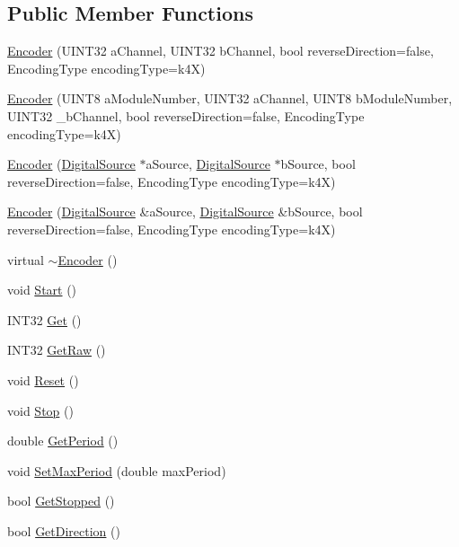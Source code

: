\subsection*{Public Member Functions}
\begin{DoxyCompactItemize}
\item 
\hyperlink{classEncoder_ae47a6cd11da6de3a2b03f4456b98c39b}{Encoder} (UINT32 aChannel, UINT32 bChannel, bool reverseDirection=false, EncodingType encodingType=k4X)
\item 
\hyperlink{classEncoder_a50acabf43b8473be8489ff29748e26e6}{Encoder} (UINT8 aModuleNumber, UINT32 aChannel, UINT8 bModuleNumber, UINT32 \_\-bChannel, bool reverseDirection=false, EncodingType encodingType=k4X)
\item 
\hyperlink{classEncoder_aa5f1987f6278c0b45c801b129f8222c9}{Encoder} (\hyperlink{classDigitalSource}{DigitalSource} $\ast$aSource, \hyperlink{classDigitalSource}{DigitalSource} $\ast$bSource, bool reverseDirection=false, EncodingType encodingType=k4X)
\item 
\hyperlink{classEncoder_a3a6d83c9e78a0bef6990558e8cf676d4}{Encoder} (\hyperlink{classDigitalSource}{DigitalSource} \&aSource, \hyperlink{classDigitalSource}{DigitalSource} \&bSource, bool reverseDirection=false, EncodingType encodingType=k4X)
\item 
virtual \hyperlink{classEncoder_a87cc8067c98c0ab2134dee3822e3b250}{$\sim$Encoder} ()
\item 
void \hyperlink{classEncoder_ac998caf5c4685e1497cac25f25534c9d}{Start} ()
\item 
INT32 \hyperlink{classEncoder_a4631259e214b2827220c9baff25e6891}{Get} ()
\item 
INT32 \hyperlink{classEncoder_a59c47ec9ef74ec6e414911a5fd6931d0}{GetRaw} ()
\item 
void \hyperlink{classEncoder_a4375bf4d88d56f5f5d09860f9062d691}{Reset} ()
\item 
void \hyperlink{classEncoder_a2b4d86aa679b2b305739165ce24d0df0}{Stop} ()
\item 
double \hyperlink{classEncoder_a9825883787337876f6d62951d7eaac24}{GetPeriod} ()
\item 
void \hyperlink{classEncoder_a53e9481bd248b04a00809a3ea69d97c1}{SetMaxPeriod} (double maxPeriod)
\item 
bool \hyperlink{classEncoder_ad55bea74aa76140ea048d22bda8de855}{GetStopped} ()
\item 
bool \hyperlink{classEncoder_a135a248f9e69f99baa7c4ab8eaf66eb2}{GetDirection} ()
\item 

\end{DoxyCompactItemize}
